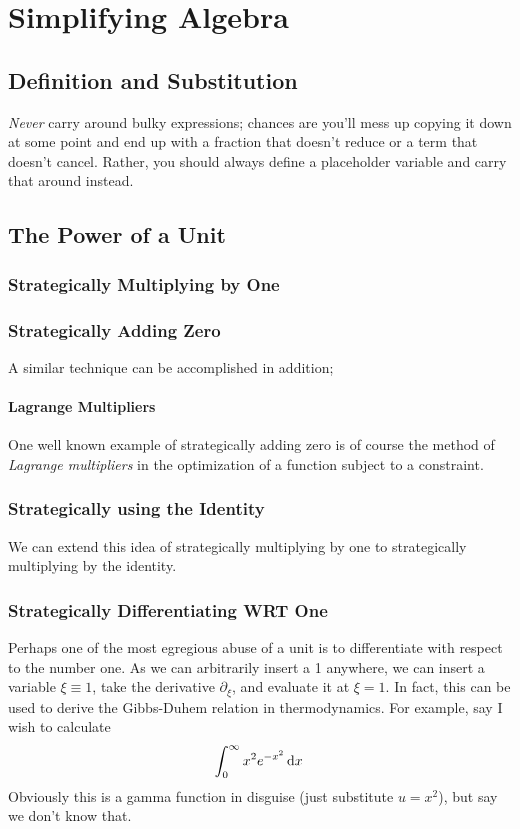 \chapter{Simplifying Algebra}\label{ch:simp}
\section{Definition and Substitution}
\emph{Never} carry around bulky expressions; chances are you'll mess up copying it down at some point and end up with a fraction that doesn't reduce or a term that doesn't cancel. Rather, you should always define a placeholder variable and carry that around instead.


\section{The Power of a Unit}
\subsection{Strategically Multiplying by One}\label{sec:smbo}
\subsection{Strategically Adding Zero}
A similar technique can be accomplished in addition;

\subsubsection{Lagrange Multipliers}
One well known example of strategically adding zero is of course the method of \emph{Lagrange multipliers} in the optimization  of a function subject to a constraint.

\subsection{Strategically using the Identity}
We can extend this idea of strategically multiplying by one to strategically multiplying by the identity.

\subsection{Strategically Differentiating WRT One}
Perhaps one of the most egregious abuse of a unit is to differentiate with respect to the number one. As we can arbitrarily insert a 1 anywhere, we can insert a variable \(\xi \equiv 1\), take the derivative \(\partial_\xi\), and evaluate it at \(\xi = 1\). In fact, this can be used to derive the Gibbs-Duhem relation in thermodynamics. For example, say I wish to calculate
\[\int_0^\infty x^2e^{-x^2}\d{x}\]
Obviously this is a gamma function in disguise (just substitute \(u=x^2\)), but say we don't know that.

